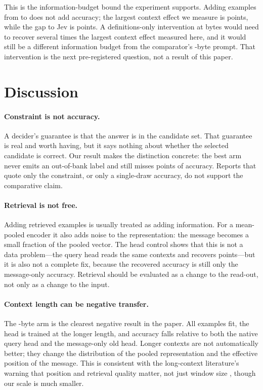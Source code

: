 \documentclass[11pt]{article}
\begin{document}
This is the information-budget bound the experiment supports. Adding examples
from \PQueryEff{} to \PExamples{} does not add accuracy; the largest context
effect we measure is \PQueryVsOldZero{} points, while the gap to Jev is
\PLenTwoGapAbs{} points. A definitions-only intervention at \PSeq{} bytes would
need to recover several times the largest context effect measured here, and it
would still be a different information budget from the comparator's
\PJevPromptMedian-byte prompt. That intervention is the next pre-registered
question, not a result of this paper.

\section{Discussion}

\paragraph{Constraint is not accuracy.}
A decider's guarantee is that the answer is in the candidate set. That
guarantee is real and worth having, but it says nothing about whether the
selected candidate is correct. Our result makes the distinction concrete: the
best arm never emits an out-of-bank label and still misses \PQueryGapAbs{}
points of accuracy. Reports that quote only the constraint, or only a
single-draw accuracy, do not support the comparative claim.

\paragraph{Retrieval is not free.}
Adding retrieved examples is usually treated as adding information. For a
mean-pooled encoder it also adds noise to the representation: the message
becomes a small fraction of the pooled vector. The head control shows that this
is not a data problem---the query head reads the same contexts and recovers
\PMechGain{} points---but it is also not a complete fix, because the recovered
accuracy is still only the message-only accuracy. Retrieval should be evaluated
as a change to the read-out, not only as a change to the input.

\paragraph{Context length can be negative transfer.}
The \PSeq-byte arm is the clearest negative result in the paper. All examples
fit, the head is trained at the longer length, and accuracy falls relative to
both the native query head and the message-only old head. Longer contexts are
not automatically better; they change the distribution of the pooled
representation and the effective position of the message. This is consistent
with the long-context literature's warning that position and retrieval quality
matter, not just window size \citep{liu2023lost,hsieh2024ruler}, though our
scale is much smaller.
\end{document}
